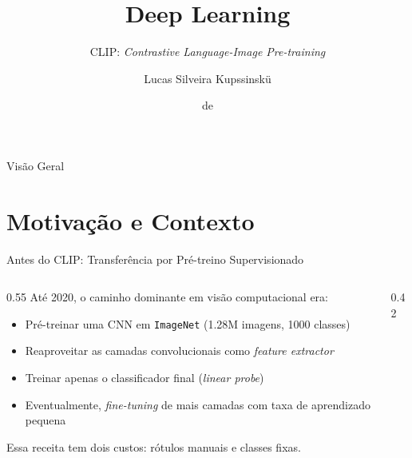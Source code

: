 \documentclass[aspectratio=169,xcolor=dvipsnames]{beamer}
\title{Deep Learning}
\subtitle{CLIP: \textit{Contrastive Language-Image Pre-training}}
\author{Lucas Silveira Kupssinskü}
\institute
{
    Machine Learning Theory and Applications Laboratory \\
    PUCRS
}
\date{\mespor de \the\year}
\begin{document}
  \begin{frame}
    \titlepage
  \end{frame}

  \begin{frame}{Visão Geral}
    \tableofcontents
  \end{frame}

  \section{Motivação e Contexto}

  \begin{frame}{Antes do CLIP: Transferência por Pré-treino Supervisionado}
    \begin{columns}[T]
      \begin{column}{0.55\textwidth}
        Até 2020, o caminho dominante em visão computacional era:
        \begin{itemize}
          \item Pré-treinar uma CNN em \texttt{ImageNet} (1.28M imagens, 1000 classes)
          \item Reaproveitar as camadas convolucionais como \textit{feature extractor}
          \item Treinar apenas o classificador final (\textit{linear probe})
          \item Eventualmente, \textit{fine-tuning} de mais camadas com taxa de aprendizado pequena
        \end{itemize}

        \vspace{0.4em}
        Essa receita tem dois custos: rótulos manuais e classes fixas.
      \end{column}
      \begin{column}{0.42\textwidth}
        \centering
      \end{column}
    \end{columns}
  \end{frame}
\end{document}

